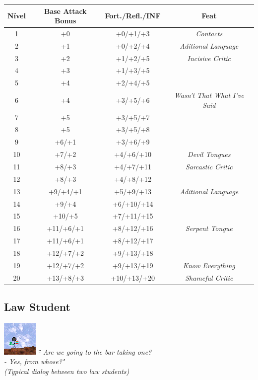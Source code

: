 \documentclass[ letterpaper,12pt]{article}
\begin{document}
\begin{center} \begin{tabular}{|c||c|c|c|}
\hline
{\bf Nível}&{\bf Base Attack Bonus}&{\bf Fort./Refl./INF}&{\bf Feat}\\
\hline
1&+0&+0/+1/+3&{\it Contacts}\\
\hline
2&+1&+0/+2/+4&{\it Aditional Language}\\
\hline
3&+2&+1/+2/+5&{\it Incisive Critic}\\
\hline
4&+3&+1/+3/+5&\\
\hline
5&+4&+2/+4/+5&\\
\hline
6&+4&+3/+5/+6&{\it Wasn't That What I've Said}\\
\hline
7&+5&+3/+5/+7&\\
\hline
8&+5&+3/+5/+8&\\
\hline
9&+6/+1&+3/+6/+9&\\
\hline
10&+7/+2&+4/+6/+10&{\it Devil Tongues}\\
\hline
11&+8/+3&+4/+7/+11&{\it Sarcastic Critic}\\
\hline
12&+8/+3&+4/+8/+12&\\
\hline
13&+9/+4/+1&+5/+9/+13&{\it Aditional Language}\\
\hline
14&+9/+4&+6/+10/+14&\\
\hline
15&+10/+5&+7/+11/+15&\\
\hline
16&+11/+6/+1&+8/+12/+16&{\it Serpent Tongue}\\
\hline
17&+11/+6/+1&+8/+12/+17&\\
\hline
18&+12/+7/+2&+9/+13/+18&\\
\hline
19&+12/+7/+2&+9/+13/+19&{\it Know Everything}\\
\hline
20&+13/+8/+3&+10/+13/+20&{\it Shameful Critic}\\
\hline
\end{tabular} \end{center}

\subsection{Law Student}
\includegraphics{../data/classes/Img/direito.png}
{\it \" - Are we going to the bar taking one?\\
        - Yes, from whose?"\\(Typical dialog between two law students)}\\
\end{document}
